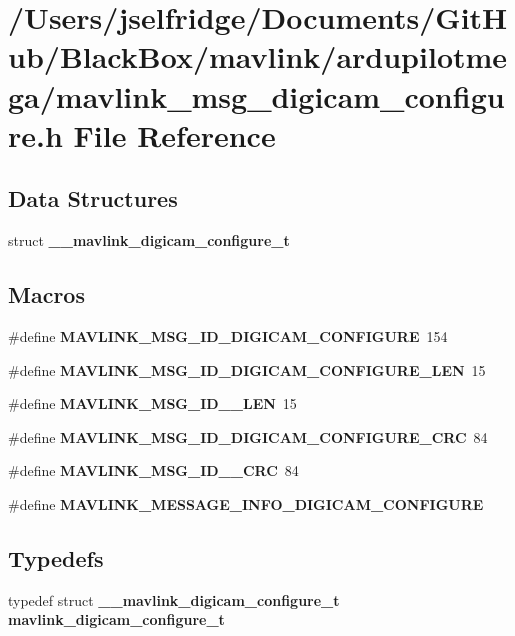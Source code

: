 \section{/\+Users/jselfridge/\+Documents/\+Git\+Hub/\+Black\+Box/mavlink/ardupilotmega/mavlink\+\_\+msg\+\_\+digicam\+\_\+configure.h File Reference}
\label{mavlink__msg__digicam__configure_8h}
\subsection*{Data Structures}
\begin{DoxyCompactItemize}
\item 
struct \textbf{ \+\_\+\+\_\+mavlink\+\_\+digicam\+\_\+configure\+\_\+t}
\end{DoxyCompactItemize}
\subsection*{Macros}
\begin{DoxyCompactItemize}
\item 
\#define \textbf{ M\+A\+V\+L\+I\+N\+K\+\_\+\+M\+S\+G\+\_\+\+I\+D\+\_\+\+D\+I\+G\+I\+C\+A\+M\+\_\+\+C\+O\+N\+F\+I\+G\+U\+RE}~154
\item 
\#define \textbf{ M\+A\+V\+L\+I\+N\+K\+\_\+\+M\+S\+G\+\_\+\+I\+D\+\_\+\+D\+I\+G\+I\+C\+A\+M\+\_\+\+C\+O\+N\+F\+I\+G\+U\+R\+E\+\_\+\+L\+EN}~15
\item 
\#define \textbf{ M\+A\+V\+L\+I\+N\+K\+\_\+\+M\+S\+G\+\_\+\+I\+D\+\_\+\_\+\+L\+EN}~15
\item 
\#define \textbf{ M\+A\+V\+L\+I\+N\+K\+\_\+\+M\+S\+G\+\_\+\+I\+D\+\_\+\+D\+I\+G\+I\+C\+A\+M\+\_\+\+C\+O\+N\+F\+I\+G\+U\+R\+E\+\_\+\+C\+RC}~84
\item 
\#define \textbf{ M\+A\+V\+L\+I\+N\+K\+\_\+\+M\+S\+G\+\_\+\+I\+D\+\_\+\_\+\+C\+RC}~84
\item 
\#define \textbf{ M\+A\+V\+L\+I\+N\+K\+\_\+\+M\+E\+S\+S\+A\+G\+E\+\_\+\+I\+N\+F\+O\+\_\+\+D\+I\+G\+I\+C\+A\+M\+\_\+\+C\+O\+N\+F\+I\+G\+U\+RE}
\end{DoxyCompactItemize}
\subsection*{Typedefs}
\begin{DoxyCompactItemize}
\item 
typedef struct \textbf{ \+\_\+\+\_\+mavlink\+\_\+digicam\+\_\+configure\+\_\+t} \textbf{ mavlink\+\_\+digicam\+\_\+configure\+\_\+t}
\end{DoxyCompactItemize}


